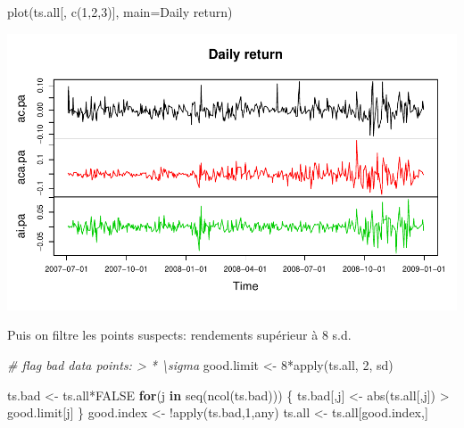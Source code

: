 \documentclass[
]{article}
\newenvironment{Shaded}{\begin{snugshade}}{\end{snugshade}}
\newcommand{\AttributeTok}[1]{\textcolor[rgb]{0.77,0.63,0.00}{#1}}
\newcommand{\CommentTok}[1]{\textcolor[rgb]{0.56,0.35,0.01}{\textit{#1}}}
\newcommand{\ConstantTok}[1]{\textcolor[rgb]{0.00,0.00,0.00}{#1}}
\newcommand{\ControlFlowTok}[1]{\textcolor[rgb]{0.13,0.29,0.53}{\textbf{#1}}}
\newcommand{\DecValTok}[1]{\textcolor[rgb]{0.00,0.00,0.81}{#1}}
\newcommand{\FunctionTok}[1]{\textcolor[rgb]{0.00,0.00,0.00}{#1}}
\newcommand{\NormalTok}[1]{#1}
\newcommand{\OtherTok}[1]{\textcolor[rgb]{0.56,0.35,0.01}{#1}}
\newcommand{\SpecialCharTok}[1]{\textcolor[rgb]{0.00,0.00,0.00}{#1}}
\newcommand{\StringTok}[1]{\textcolor[rgb]{0.31,0.60,0.02}{#1}}
\begin{document}
\begin{Shaded}
\begin{Highlighting}[]
\FunctionTok{plot}\NormalTok{(ts.all[, }\FunctionTok{c}\NormalTok{(}\DecValTok{1}\NormalTok{,}\DecValTok{2}\NormalTok{,}\DecValTok{3}\NormalTok{)], }\AttributeTok{main=}\StringTok{\textquotesingle{}Daily return\textquotesingle{}}\NormalTok{)}
\end{Highlighting}
\end{Shaded}

\includegraphics{TP1-Co_files/figure-latex/plot-cac-1-1.pdf}

Puis on filtre les points suspects: rendements supérieur à 8 s.d.

\begin{Shaded}
\begin{Highlighting}[]
  \CommentTok{\# flag bad data points: \textgreater{} * \textbackslash{}sigma}
\NormalTok{  good.limit }\OtherTok{\textless{}{-}} \DecValTok{8}\SpecialCharTok{*}\FunctionTok{apply}\NormalTok{(ts.all, }\DecValTok{2}\NormalTok{, sd)}
  
\NormalTok{  ts.bad }\OtherTok{\textless{}{-}}\NormalTok{ ts.all}\SpecialCharTok{*}\ConstantTok{FALSE}
  \ControlFlowTok{for}\NormalTok{(j }\ControlFlowTok{in} \FunctionTok{seq}\NormalTok{(}\FunctionTok{ncol}\NormalTok{(ts.bad))) \{}
\NormalTok{    ts.bad[,j] }\OtherTok{\textless{}{-}} \FunctionTok{abs}\NormalTok{(ts.all[,j]) }\SpecialCharTok{\textgreater{}}\NormalTok{ good.limit[j]}
\NormalTok{  \}}
\NormalTok{  good.index }\OtherTok{\textless{}{-}} \SpecialCharTok{!}\FunctionTok{apply}\NormalTok{(ts.bad,}\DecValTok{1}\NormalTok{,any)}
\NormalTok{  ts.all }\OtherTok{\textless{}{-}}\NormalTok{ ts.all[good.index,]}
\end{Highlighting}
\end{Shaded}
\end{document}
